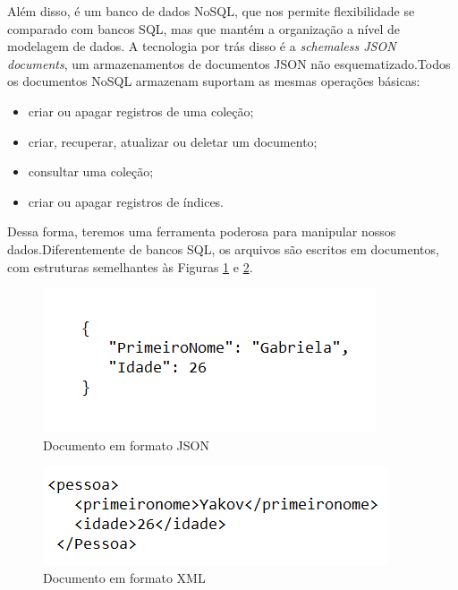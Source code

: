 \par Além disso, é um banco de dados NoSQL, que nos permite flexibilidade se comparado com bancos SQL, mas que mantém a organização a nível de modelagem de dados. A tecnologia por trás disso é a \textit{schemaless JSON documents}, um armazenamentos de documentos JSON não esquematizado.Todos os documentos NoSQL armazenam suportam as mesmas operações básicas:

\begin{itemize}
    \item criar ou apagar registros de uma coleção;
    \item criar, recuperar, atualizar ou deletar um documento;
    \item consultar uma coleção;
    \item criar ou apagar registros de índices. 
\end{itemize}

\par Dessa forma, teremos uma ferramenta poderosa para manipular nossos dados.Diferentemente de bancos SQL, os arquivos são escritos em documentos, com estruturas semelhantes às Figuras \ref{fig:json} e \ref{fig:xml}.

\begin{figure}[!h]
	\centering
	\label{json}
		\includegraphics[keepaspectratio=true,scale=0.9]{figuras/json.png}
	\caption{Documento em formato JSON}
	\label{fig:json}
\end{figure}

\begin{figure}[!h]
	\centering
	\label{xml}
		\includegraphics[keepaspectratio=true,scale=0.9]{figuras/xml.png}
	\caption{Documento em formato XML}
	\label{fig:xml}
\end{figure}

